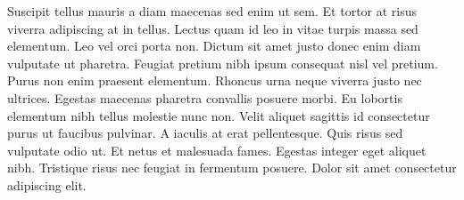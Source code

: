 \documentclass[10pt,oneside,a4paper]{article}
\begin{document}
\begin{multicols}{2}
Suscipit tellus mauris a diam maecenas sed enim ut sem. Et tortor at risus viverra adipiscing at in tellus. Lectus quam id leo in vitae turpis massa sed elementum. Leo vel orci porta non. Dictum sit amet justo donec enim diam vulputate ut pharetra. Feugiat pretium nibh ipsum consequat nisl vel pretium. Purus non enim praesent elementum. Rhoncus urna neque viverra justo nec ultrices. Egestas maecenas pharetra convallis posuere morbi. Eu lobortis elementum nibh tellus molestie nunc non. Velit aliquet sagittis id consectetur purus ut faucibus pulvinar. A iaculis at erat pellentesque. Quis risus sed vulputate odio ut. Et netus et malesuada fames. Egestas integer eget aliquet nibh. Tristique risus nec feugiat in fermentum posuere. Dolor sit amet consectetur adipiscing elit.


\end{multicols}
\end{document}
